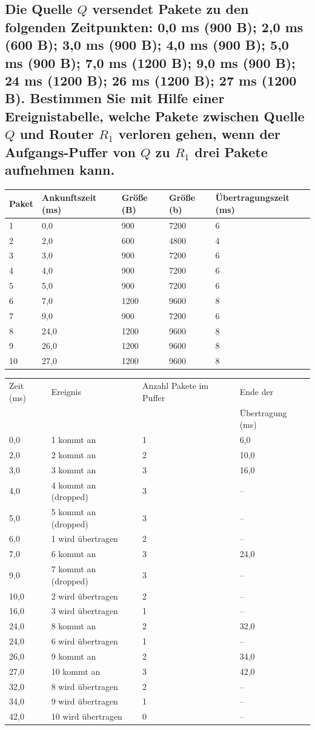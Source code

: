 \documentclass[a4paper, fleqn]{scrartcl}
\begin{document}
\subsection{Die Quelle $Q$ versendet Pakete zu den folgenden Zeitpunkten: 0,0 ms (900 B); 2,0 ms (600 B); 3,0 ms (900 B); 4,0 ms (900 B); 5,0 ms (900 B); 7,0 ms (1200 B); 9,0 ms (900 B); 24 ms (1200 B); 26 ms (1200 B); 27 ms (1200 B). Bestimmen Sie mit Hilfe einer Ereignistabelle, welche Pakete zwischen Quelle $Q$ und Router $R_1$ verloren gehen, wenn der Aufgangs-Puffer von $Q$ zu $R_1$ drei Pakete aufnehmen kann.}
\begin{tabular}{|l|l|l|l|l|}
    \hline
    Paket & Ankunftszeit (ms) & Größe (B) & Größe (b) & Übertragungszeit (ms)\\
    \hline
    1 & 0,0 & 900 & 7200 & 6\\
    2 & 2,0 & 600 & 4800 & 4\\
    3 & 3,0 & 900 & 7200 & 6\\
    4 & 4,0 & 900 & 7200 & 6\\
    5 & 5,0 & 900 & 7200 & 6\\
    6 & 7,0 & 1200 & 9600 & 8\\
    7 & 9,0 & 900 & 7200 & 6\\
    8 & 24,0 & 1200 & 9600 & 8\\
    9 & 26,0 & 1200 & 9600 & 8\\
    10 & 27,0 & 1200 & 9600 & 8\\
    \hline
\end{tabular}
\newline
\vspace{1em}
\newline
\begin{tabular}{|l|l|l|l|}
    \hline
    Zeit (ms) & Ereignis & Anzahl Pakete im Puffer & Ende der\\
    & & & Übertragung (ms)\\
    \hline
    0,0 & 1 kommt an & 1 & 6,0\\
    2,0 & 2 kommt an & 2 & 10,0\\
    3,0 & 3 kommt an & 3 & 16,0\\
    4,0 & 4 kommt an (dropped) & 3 & --\\
    5,0 & 5 kommt an (dropped) & 3 & --\\
    6,0 & 1 wird übertragen & 2 & --\\
    7,0 & 6 kommt an & 3 & 24,0\\
    9,0 & 7 kommt an (dropped) & 3 & --\\
    10,0 & 2 wird übertragen & 2 & --\\
    16,0 & 3 wird übertragen & 1 & --\\
    24,0 & 8 kommt an & 2 & 32,0\\
    24,0 & 6 wird übertragen & 1 & --\\
    26,0 & 9 kommt an & 2 & 34,0\\
    27,0 & 10 kommt an & 3 & 42,0\\
    32,0 & 8 wird übertragen & 2 & --\\
    34,0 & 9 wird übertragen & 1 & --\\
    42,0 & 10 wird übertragen & 0 & --\\
    \hline
\end{tabular}
\end{document}
